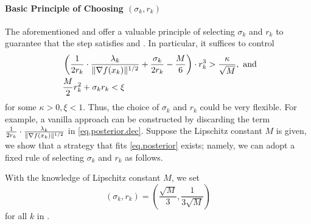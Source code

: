 \paragraph{Basic Principle of Choosing $(\sigma_k, r_k)$}
The aforementioned  and  offer a valuable principle of selecting $\sigma_k$ and $r_k$ to guarantee that the step satisfies  and . In particular, it suffices to control
\begin{subequations}\label{eq.posterior}
    \begin{align}
        \label{eq.posterior.dec} & ~\left (\frac{1}{2r_k} \cdot \frac{\lambda_k}{\|\nabla f(x_k)\|^{1/2}} + \frac{\sigma_k}{2r_k} - \frac{M}{6}\right )\cdot r_k^3 > \frac{\kappa}{\sqrt{M}}, \ \text{and} \\
        \label{eq.posterior.con} & ~ \frac{M}{2} r_k^2 + \sigma_k r_k < \xi
    \end{align}
\end{subequations}
for some $\kappa > 0, \xi < 1$.
Thus, the choice of $\sigma_k$ and $r_k$ could be very flexible. For example, a vanilla approach can be constructed by discarding the term $\frac{1}{2r_k} \cdot \frac{\lambda_k}{\|\nabla f(x_k)\|^{1/2}}$ in \eqref{eq.posterior.dec}.
Suppose the Lipschitz constant $M$ is given, we show that a strategy that fits \eqref{eq.posterior} exists; namely, we can adopt a fixed rule of selecting $\sigma_k$ and $r_k$ as follows.
\begin{strategy}\label{strategy.simple strategy}
    With the knowledge of Lipschitz constant $M$, we set
    \begin{equation}\label{eq.simplerule}
        \left(\sigma_k, r_k\right) = \left(\frac{\sqrt{M}}{3}, \frac{1}{3\sqrt{M}}\right)
    \end{equation}
    for all $k$ in .
\end{strategy}
